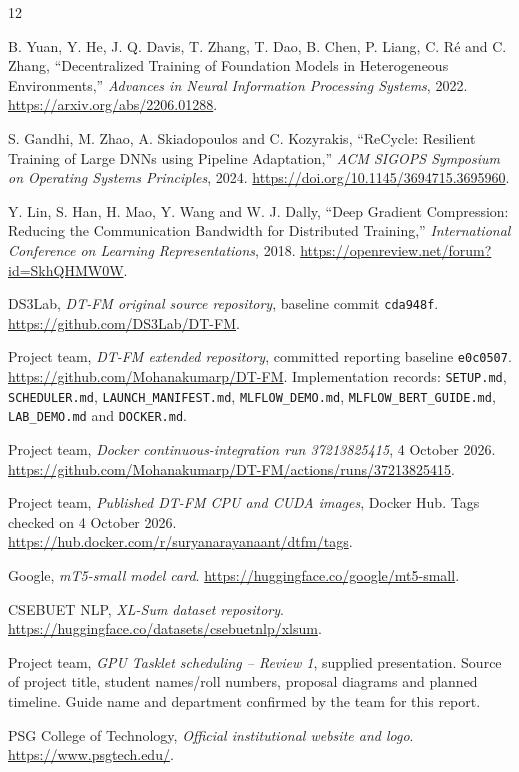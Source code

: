 \FloatBarrier
\newpage
{}
\begingroup
\small
{}
\begin{thebibliography}{12}
\setlength{\itemsep}{5pt}

B. Yuan, Y. He, J. Q. Davis, T. Zhang, T. Dao, B. Chen, P. Liang, C. R\'e and C. Zhang,
``Decentralized Training of Foundation Models in Heterogeneous Environments,''
\textit{Advances in Neural Information Processing Systems}, 2022.
\url{https://arxiv.org/abs/2206.01288}.

S. Gandhi, M. Zhao, A. Skiadopoulos and C. Kozyrakis,
``ReCycle: Resilient Training of Large DNNs using Pipeline Adaptation,''
\textit{ACM SIGOPS Symposium on Operating Systems Principles}, 2024.
\url{https://doi.org/10.1145/3694715.3695960}.

Y. Lin, S. Han, H. Mao, Y. Wang and W. J. Dally,
``Deep Gradient Compression: Reducing the Communication Bandwidth for Distributed Training,''
\textit{International Conference on Learning Representations}, 2018.
\url{https://openreview.net/forum?id=SkhQHMW0W}.

DS3Lab, \textit{DT-FM original source repository}, baseline commit \texttt{cda948f}.
\url{https://github.com/DS3Lab/DT-FM}.

Project team, \textit{DT-FM extended repository}, committed reporting baseline \texttt{e0c0507}.
\url{https://github.com/Mohanakumarp/DT-FM}.
Implementation records: \texttt{SETUP.md}, \texttt{SCHEDULER.md}, \texttt{LAUNCH\_MANIFEST.md},
\texttt{MLFLOW\_DEMO.md}, \texttt{MLFLOW\_BERT\_GUIDE.md}, \texttt{LAB\_DEMO.md} and \texttt{DOCKER.md}.

Project team, \textit{Docker continuous-integration run 37213825415}, 4 October 2026.
\url{https://github.com/Mohanakumarp/DT-FM/actions/runs/37213825415}.

Project team, \textit{Published DT-FM CPU and CUDA images}, Docker Hub. Tags checked on 4 October 2026.
\url{https://hub.docker.com/r/suryanarayanaant/dtfm/tags}.

Google, \textit{mT5-small model card}.
\url{https://huggingface.co/google/mt5-small}.

CSEBUET NLP, \textit{XL-Sum dataset repository}.
\url{https://huggingface.co/datasets/csebuetnlp/xlsum}.

Project team, \textit{GPU Tasklet scheduling -- Review 1}, supplied presentation.
Source of project title, student names/roll numbers, proposal diagrams and planned timeline.
Guide name and department confirmed by the team for this report.

PSG College of Technology, \textit{Official institutional website and logo}.
\url{https://www.psgtech.edu/}.

\end{thebibliography}
\endgroup


